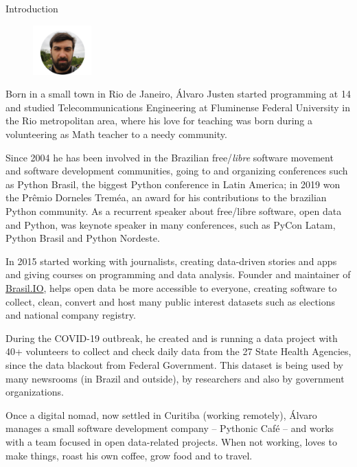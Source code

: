 \documentclass[a4paper,11pt]{article}
\begin{document}
\begin{section}{Introduction}

	\begin{figure}
			\begin{center}
				\includegraphics[width=0.2\textwidth]{turicas-cwb}
			\end{center}
	\end{figure}

	Born in a small town in Rio de Janeiro, Álvaro Justen started programming
	at 14 and studied Telecommunications Engineering at Fluminense Federal
	University in the Rio metropolitan area, where his love for teaching was
	born during a volunteering as Math teacher to a needy community.

	Since 2004 he has been involved in the Brazilian free/\textit{libre}
	software movement and software development communities, going to and
	organizing conferences such as Python Brasil, the biggest Python conference
	in Latin America; in 2019 won the Prêmio Dorneles Treméa, an award for his
	contributions to the brazilian Python community. As a recurrent speaker
	about free/libre software, open data and Python, was keynote speaker in
	many conferences, such as PyCon Latam, Python Brasil and Python Nordeste.

	In 2015 started working with journalists, creating data-driven stories and
	apps and giving courses on programming and data analysis. Founder and
	maintainer of \url{Brasil.IO}, helps open data be more accessible to
	everyone, creating software to collect, clean, convert and host many public
	interest datasets such as elections and national company registry.

	During the COVID-19 outbreak, he created and is running a data project with
	40+ volunteers to collect and check daily data from the 27 State Health
	Agencies, since the data blackout from Federal Government. This dataset is
	being used by many newsrooms (in Brazil and outside), by researchers and
	also by government organizations.

	Once a digital nomad, now settled in Curitiba (working remotely), Álvaro
	manages a small software development company -- Pythonic Café -- and works
	with a team focused in open data-related projects. When not working, loves
	to make things, roast his own coffee, grow food and to travel.
\end{section}
\end{document}
